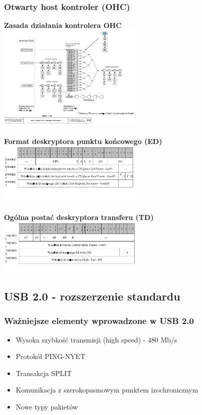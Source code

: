 \documentclass[a4paper,twoside]{article}
\begin{document}
	\subsubsection{Otwarty host kontroler (OHC)}
	\textbf{Zasada działania kontrolera OHC}\\
	\includegraphics[width=7cm]{./wyklady/USB_49_1.pdf}\\\\
	\textbf{Format deskryptora punktu końcowego (ED)}\\
	\includegraphics[width=7cm]{./wyklady/USB_50_1.pdf}\\\\
	\textbf{Ogólna postać deskryptora transferu (TD)}\\
	\includegraphics[width=7cm]{./wyklady/USB_51_1.pdf}
	
\subsection{USB 2.0 - rozszerzenie standardu}
	\subsubsection{Ważniejsze elementy wprowadzone w USB 2.0}
	\begin{itemize}
		\item Wysoka szybkość transmisji (high speed) - 480 Mb/s
		\item Protokół PING-NYET
		\item Transakcja SPLIT
		\item Komunikacja z szerokopasmowym punktem izochronicznym
		\item Nowe typy pakietów
	\end{itemize}
\end{document}

